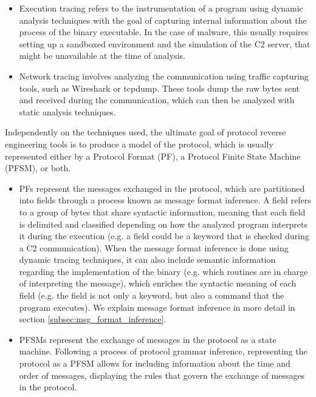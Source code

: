 \documentclass[conference]{IEEEtran}
\begin{document}
\begin{itemize}
    \item Execution tracing refers to the instrumentation of a program using dynamic
          analysis techniques with the goal of capturing internal information about the
          process of the binary executable. In the case of malware, this usually requires
          setting up a sandboxed environment and the simulation of the C2 server, that
          might be unavailable at the time of analysis.
    \item Network tracing involves analyzing the communication using traffic capturing
          tools, such as Wireshark or tcpdump. These tools dump the raw bytes sent and
          received during the communication, which can then be analyzed with static
          analysis techniques.
\end{itemize}

Independently on the techniques used, the ultimate goal of protocol reverse
engineering tools is to produce a model of the protocol, which is usually
represented either by a Protocol Format (PF), a Protocol Finite State Machine
(PFSM), or both.
\begin{itemize}
    \item PFs represent the messages exchanged in the protocol, which are partitioned
          into fields through a process known as message format inference. A field refers
          to a group of bytes that share syntactic information, meaning that each field
          is delimited and classified depending on how the analyzed program interprets it
          during the execution \cite{polyglot_caballero} (e.g. a field could be a keyword
          that is checked during a C2 communication). When the message format inference
          is done using dynamic tracing techniques, it can also include semantic
          information regarding the implementation of the binary (e.g. which routines are
          in charge of interpreting the message), which enriches the syntactic meaning of
          each field (e.g. the field is not only a keyword, but also a command that the
          program executes). We explain message format inference in more detail in
          section \ref{subsec:msg_format_inference}.
    \item PFSMs represent the exchange of messages in the protocol as a state machine.
          Following a process of protocol grammar inference, representing the protocol as
          a PFSM allows for including information about the time and order of messages,
          displaying the rules that govern the exchange of messages in the protocol.
\end{itemize}
\end{document}
